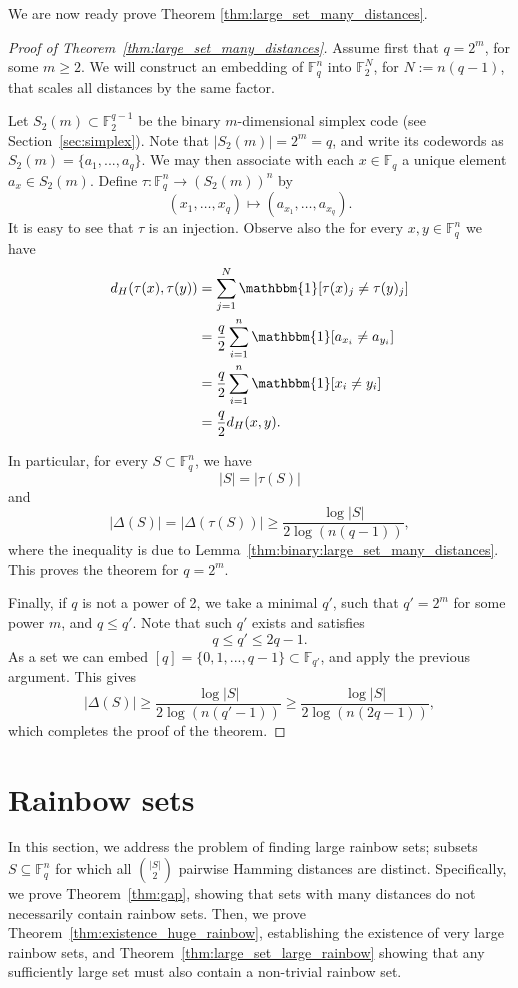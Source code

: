 \documentclass{article}
\theoremstyle{definition}
\begin{document}
 


We are now ready prove Theorem \ref{thm:large_set_many_distances}. 
\begin{proof}[Proof of Theorem~\ref{thm:large_set_many_distances}]
Assume first that $q=2^m$, for some $m\ge 2$. 
We will construct an embedding of $\mathbb{F}_q^n$ into $\mathbb{F}_2^{N}$, for $N:=n(q-1)$, that scales all distances by the same factor. 

Let $S_2(m)\subset \mathbb{F}_2^{q-1}$ be the binary $m$-dimensional simplex code (see Section~\ref{sec:simplex}).
Note that $|S_2(m)|=2^m=q$, and write its codewords as 
$S_2(m) = \{a_1,...,a_q\}$. We may then associate  with each $x\in \mathbb{F}_q$ a unique element $a_x\in S_2(m)$.
Define $\tau: \mathbb{F}_q^n \rightarrow \left(S_2(m)\right)^n$
by 
$$
(x_1,\ldots,x_q)\mapsto (a_{x_1},\ldots,a_{x_q}).
$$
It is easy to see that $\tau$ is an injection. Observe also the for every $x,y\in \mathbb{F}_q^n$ we have 
\begin{align*}
    d_H(\tau(x),\tau(y)) &= \sum_{j=1}^{N} \mathbbm{1}[\tau(x)_j \neq \tau(y)_j]\\
    &=
\frac{q}{2}\sum_{i=1}^{n} \mathbbm{1}[a_{x_i} \neq a_{y_i}]  \\
&=
\frac{q}{2}\sum_{i=1}^n \mathbbm{1}[x_i \neq y_i] \\
&=\frac{q}{2} d_H(x,y).
\end{align*}

In particular, for every $S\subset \mathbb{F}_q^n$, we have  
$$
|S|=|\tau(S)|$$
and 
$$|\Delta(S)|=|\Delta(\tau(S))|\ge \frac{\log |S|}{2\log (n(q-1))},$$
where the inequality is due to Lemma~\ref{thm:binary:large_set_many_distances}. 
This proves the theorem for $q=2^m$.

Finally, if $q$ is not a power of 2, we take a minimal $q'$, such that $q'=2^m$ for some power $m$, and $q\le q'$. Note that such $q'$ exists and satisfies 
$$
q\le q'\le 2q-1.
$$
As a set we can embed $[q]=\{0,1,...,q-1\}\subset \mathbb{F}_{q'}$, and apply the previous argument. 
This  gives
 $$|\Delta(S)|   \ge \frac{\log |S|}{2\log(n(q'{-}1))}  \ge \frac{\log |S|}{2\log(n(2q{-}1))},$$
which completes the proof of the theorem. 
\end{proof}







 


 

\section{Rainbow sets}
\label{sec:rainbow}
In this section,   we address the problem of finding large rainbow sets; subsets \(S\subseteq \mathbb{F}_q^n\) for which all \(\binom{|S|}{2}\) pairwise Hamming distances are distinct. 
Specifically, 
we prove Theorem~\ref{thm:gap}, showing that sets with many distances do not necessarily contain rainbow sets. Then, we prove Theorem~\ref{thm:existence_huge_rainbow}, establishing the existence of very large rainbow sets, and Theorem~\ref{thm:large_set_large_rainbow} showing that any sufficiently large set must also contain a non-trivial rainbow set. 
\end{document}
